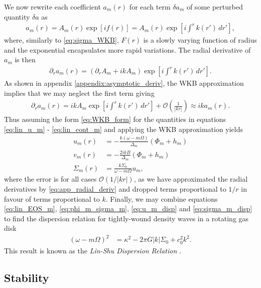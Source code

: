We now rewrite each coefficient $a_m(r)$ for each term $\delta a_m$ of some perturbed quantity $\delta a$ as
\begin{align}
    a_m(r) = A_m(r) \exp \left[ i f(r) \right] = A_m(r) \exp \left[ i \int^r k(r') \, dr' \right], \label{eq:WKB_form}
\end{align}
where, similarly to \ref{eq:sigma_WKB}, $F(r)$ is a slowly varying function of radius and the exponential encapsulates more rapid variations. 
The radial derivative of $a_m$ is then
\begin{align}
    \partial_r a_m(r) = \left( \partial_r A_m + ikA_m  \right) \exp \left[ i \int^r k(r') \, dr' \right].
\end{align}
As shown in appendix \ref{appendix:asymptotic_deriv}, the WKB approximation implies that we may neglect the first term giving
\begin{align}
    \partial_r a_m(r) = ikA_m \exp \left[ i \int^r k(r') \, dr' \right] + \mathcal{O}\left(\frac{1}{|kr|}\right) \approx ik a_m(r). \label{eq:app_radial_deriv}
\end{align}
Thus assuming the form \ref{eq:WKB_form} for the quantities in equations \ref{eq:lin_u_m} - \ref{eq:lin_cont_m} and applying the WKB approximation yields
\begin{align}
    u_m(r) &= - \frac{k(\omega-m\Omega)}{\Delta_m} (\Phi_m + h_m) \label{eq:u_m_disp} \\
    v_m(r) &= - \frac{2ikB}{\Delta_m} (\Phi_m + h_m) \label{eq:v_m_disp} \\
    \Sigma_m(r) &= \frac{k \Sigma_0}{\omega-m\Omega} u_m, \label{eq:sigma_m_disp}
\end{align}
where the error is for all cases $\mathcal{O}(1/|kr|)$, as we have approximated the radial derivatives by \ref{eq:app_radial_deriv} and dropped terms proportional to $1/r$ in favour of terms proportional to $k$.
Finally, we may combine equations \ref{eq:lin_EOS_m}, \ref{eq:phi_m_sigma_m}, \ref{eq:u_m_disp} and \ref{eq:sigma_m_disp} to find the dispersion relation for tightly-wound density waves in a rotating gas disk
\begin{align}
    \left( \omega - m \Omega  \right)^2 &= \kappa^2 - 2 \pi G |k| \Sigma_0 + c_0^2 k^2. \label{eq:lin_shu_disp}
\end{align}
This result is known as the \textit{Lin-Shu Dispersion Relation} \citep{lin1964}.

\subsection{Stability}

